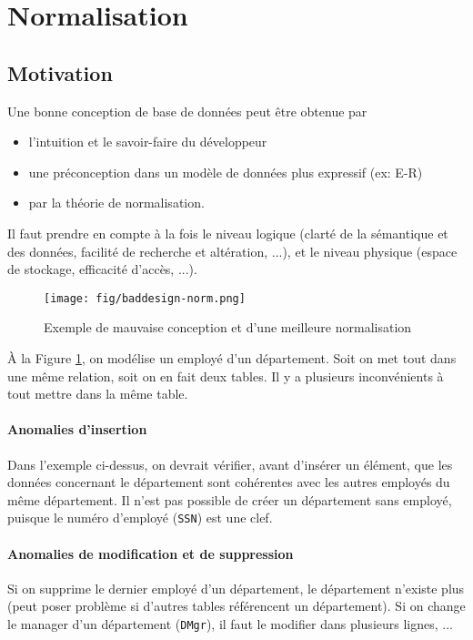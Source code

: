 \documentclass[a4paper]{article}
\begin{document}

\section{Normalisation}
\subsection{Motivation}
Une bonne conception de base de données peut être obtenue par
\begin{itemize}
  \item l'intuition et le savoir-faire du développeur
  \item une préconception dans un modèle de données plus expressif (ex: E-R)
  \item par la théorie de normalisation.
\end{itemize}

Il faut prendre en compte à la fois le niveau logique (clarté de la sémantique et des données,
facilité de recherche et altération, ...), et le niveau physique (espace de stockage, efficacité d'accès, ...).

\begin{figure}[H]
\center
\texttt{[image: fig/baddesign-norm.png]}
\caption{\label{fig:baddesign-norm} Exemple de mauvaise conception et d'une meilleure normalisation}
\end{figure}

\`A la Figure \ref{fig:baddesign-norm}, on modélise un employé d'un département.
Soit on met tout dans une même relation, soit on en fait deux tables. Il y a plusieurs
inconvénients à tout mettre dans la même table.

\paragraph{Anomalies d'insertion}
Dans l'exemple ci-dessus, on devrait vérifier, avant d'insérer un élément, que
les données concernant le département sont cohérentes avec les autres employés
du même département. Il n'est pas possible de créer un département sans employé,
puisque le numéro d'employé (\texttt{SSN}) est une clef.

\paragraph{Anomalies de modification et de suppression}
Si on supprime le dernier employé d'un département, le département n'existe plus
(peut poser problème si d'autres tables référencent un département). Si on change
le manager d'un département (\texttt{DMgr}), il faut le modifier dans plusieurs
lignes, ...
\end{document}
